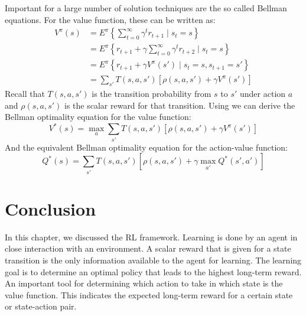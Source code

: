 \documentclass[a4paper,11pt]{mscLiterature}
\begin{document}
Important for a large number of solution techniques are the so called Bellman equations. For the value function, these can be written as:
\begin{equation}\label{eqn:bellmanEquations}
\begin{aligned}
	V^\pi(s) &= E^\pi \left\{ \sum_{t=0}^{\infty}\gamma^t r_{t+1} \mid s_t=s \right\} \\
	& = E^\pi \left\{ r_{t+1} + \gamma\sum_{t=0}^{\infty}\gamma^t r_{t+2} \mid s_t = s \right\} \\
	& = E^\pi \left\{ r_{t+1} + \gamma V^\pi(s') \mid s_t = s, s_{t+1} = s' \right\} \\
	& = \sum_{s'} T(s,a,s') \left[ \rho(s,a,s') +\gamma V^\pi(s') \right]
\end{aligned}
\end{equation}
Recall that $T(s,a,s')$ is the transition probability from $s$ to $s'$ under action $a$ and $\rho(s,a,s')$ is the scalar reward for that transition. Using  we can derive the Bellman optimality equation for the value function:
\begin{equation}\label{eqn:bellmanOptimalityEquationStateValues}
	V^*(s) = \max_{a} \sum_{s'} T(s,a,s') \left[ \rho(s,a,s') +\gamma V^\pi(s') \right]
\end{equation}
And the equivalent Bellman optimality equation for the action-value function:
\begin{equation}\label{eqn:bellmanOptimalityEquationActionStateValues}
	Q^*(s) = \sum_{s'} T(s,a,s') \left[ \rho(s,a,s') +\gamma \max_{a'}Q^*(s',a') \right]
\end{equation}


\section{Conclusion}
In this chapter, we discussed the RL framework. Learning is done by an agent in close interaction with an environment. A scalar reward that is given for a state transition is the only information available to the agent for learning. The learning goal is to determine an optimal policy that leads to the highest long-term reward. An important tool for determining which action to take in which state is the value function. This indicates the expected long-term reward for a certain state or state-action pair. 
\end{document}
